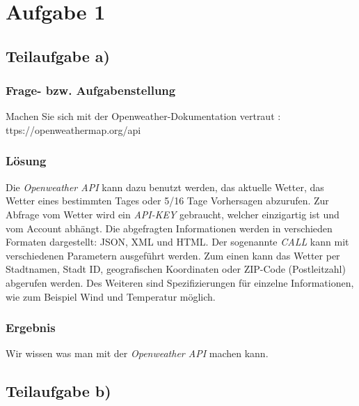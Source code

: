 \newcommand{\env}[1]{\texttt{#1}}
\newcommand{\command}[1]{\texttt{#1}}
\newcommand{\package}[1]{\texttt{\itshape#1}}
\newcommand{\engl}[1]{(engl: \textit{#1})\xspace}
\setlength{\parindent}{0pt}
\lstset{extendedchars=\true}
\lstset{inputencoding=ansinew}
\newpage

\section{Aufgabe 1}

\subsection{Teilaufgabe a)}

\subsubsection{Frage- bzw. Aufgabenstellung}

Machen Sie sich mit der Openweather-Dokumentation vertraut : ttps://openweathermap.org/api

\subsubsection{Lösung}

Die \textit{Openweather API} kann dazu benutzt werden, das aktuelle Wetter, das Wetter eines bestimmten Tages oder 5/16 Tage Vorhersagen abzurufen. 
Zur Abfrage vom Wetter wird ein \textit{API-KEY} gebraucht, welcher einzigartig ist und vom Account abhängt. Die abgefragten Informationen werden in verschieden Formaten dargestellt: JSON, XML und HTML.
Der sogenannte \textit{CALL} kann mit verschiedenen Parametern ausgeführt werden. Zum einen kann das Wetter per Stadtnamen, Stadt ID, geografischen Koordinaten oder ZIP-Code (Postleitzahl) abgerufen werden. 
Des Weiteren sind Spezifizierungen für einzelne Informationen, wie zum Beispiel Wind und Temperatur möglich.

\subsubsection{Ergebnis}

Wir wissen was man mit der \textit{Openweather API} machen kann.

\subsection{Teilaufgabe b)}

